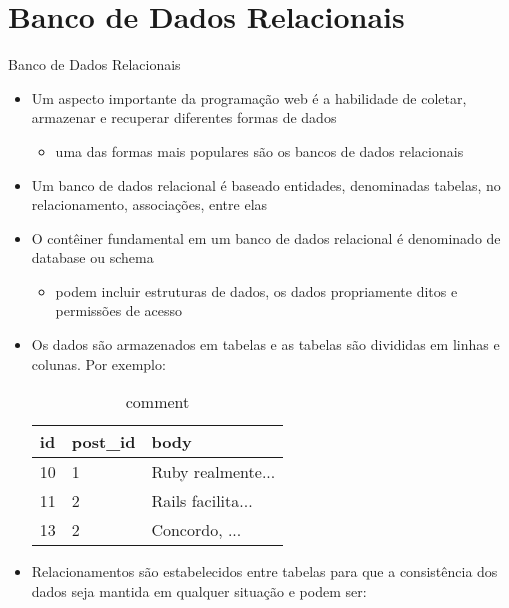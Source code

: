 \section{Banco de Dados Relacionais}
\begin{frame}{Banco de Dados Relacionais}
	\begin{itemize}
		\item Um aspecto importante da programação web é a habilidade de coletar, armazenar e recuperar
		diferentes formas de dados
		\begin{itemize}
			\item uma das formas mais populares são os \alert{bancos de dados relacionais}
		\end{itemize} 
		\item Um banco de dados relacional é baseado entidades, denominadas \alert{tabelas}, no
		relacionamento, \alert{associações}, entre elas
		\item O contêiner fundamental em um banco de dados relacional é denominado de \alert{database} ou \alert{schema}
		\begin{itemize}
			\item podem incluir estruturas de dados, os dados propriamente ditos e permissões de acesso
		\end{itemize}  
		\framebreak
		\item Os dados são armazenados em \alert{tabelas} e as tabelas são divididas em \alert{linhas} e \alert{colunas}.
		Por exemplo:
		\begin{table}[tp] 
			\scriptsize 
			\caption{comment}
			\setlength{\tabcolsep}{8pt}
			\setlength{\extrarowheight}{2pt}   			
			\begin{tabular}{|l|l|l|} 
				\hline
				\textbf{id} & \textbf{post\_id} & \textbf{body}\\
				\hline
				10 & 1 & Ruby realmente... \\
				\hline
				11 & 2 & Rails facilita... \\
				\hline
				13 & 2 & Concordo, ... \\
				\hline
			\end{tabular}
		\end{table}
		\pagebreak
		\item Relacionamentos são estabelecidos entre tabelas para que a consistência dos dados
		seja mantida em qualquer situação e podem ser:
		\begin{itemize}

\end{itemize}
\end{itemize}
\end{frame}
